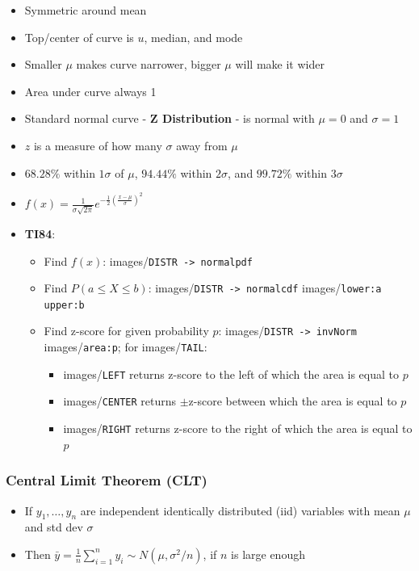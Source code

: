 \documentclass{article}
\newcommand{\code}[1]{images/\colorbox{light-gray}{\texttt{#1}}}
\begin{document}
\begin{itemize}
    \item Symmetric around mean
    \item Top/center of curve is $u$, median, and mode
    \item Smaller $\mu$ makes curve narrower, bigger $\mu$ will make it wider
    \item Area under curve always 1
    \item Standard normal curve - \textbf{Z Distribution} - is normal with $\mu=0$ and $\sigma=1$
    \item $z$ is a measure of how many $\sigma$ away from $\mu$
    \item $68.28\%$ within $1\sigma$ of $\mu$, $94.44\%$ within $2\sigma$, and $99.72\%$ within $3\sigma$
    \item $f(x)=\frac{1}{\sigma \sqrt{2\pi}}e^{-\frac{1}{2}(\frac{x-\mu}{\sigma})^2}$
    \item \textbf{TI84}:
    \begin{itemize}
        \item Find $f(x)$: \code{DISTR -> normalpdf}
        \item Find $P(a\leq X\leq b)$: \code{DISTR -> normalcdf} \code{lower:a upper:b}
        \item Find z-score for given probability $p$: \code{DISTR -> invNorm} \code{area:p}; for \code{TAIL}:
        \begin{itemize}
            \item \code{LEFT} returns z-score to the left of which the area is equal to $p$
            \item \code{CENTER} returns $\pm$z-score between which the area is equal to $p$
            \item \code{RIGHT} returns z-score to the right of which the area is equal to $p$
        \end{itemize}
    \end{itemize}
\end{itemize}

\subsubsection{Central Limit Theorem (CLT)}

\begin{itemize}
    \item If $y_1,\dots,y_n$ are independent identically distributed (iid) variables with mean $\mu$ and std dev $\sigma$
    \item Then $\bar{y}=\frac{1}{n}\sum_{i=1}^{n}y_i \sim N(\mu, \sigma^2 /n)$, if $n$ is large enough
\end{itemize}
\end{document}
